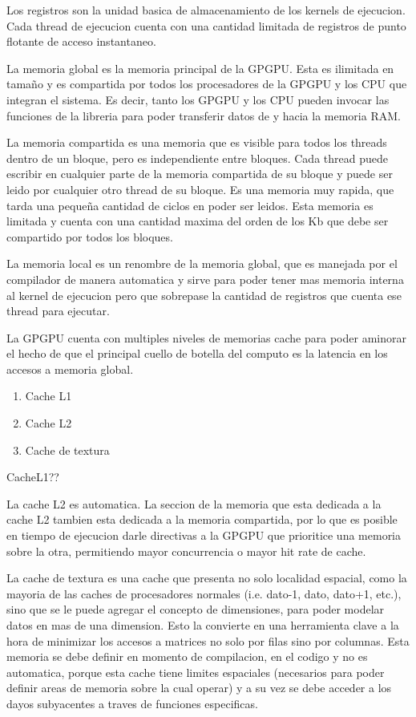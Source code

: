 Los registros son la unidad basica de almacenamiento de los kernels de ejecucion.
Cada thread de ejecucion cuenta con una cantidad limitada de registros de punto flotante de
acceso instantaneo. 

La memoria global es la memoria principal de la GPGPU. Esta es ilimitada en tama\~no 
y es compartida por todos los procesadores de la GPGPU y los CPU que integran el 
sistema. Es decir, tanto los GPGPU y los CPU pueden invocar las funciones de la libreria
para poder transferir datos de y hacia la memoria RAM.

La memoria compartida es una memoria que es visible para todos los threads dentro
de un bloque, pero es independiente entre bloques. Cada thread puede escribir en cualquier
parte de la memoria compartida de su bloque y puede ser leido por cualquier otro thread
de su bloque. Es una memoria muy rapida, que tarda una peque\~na cantidad de ciclos 
en poder ser leidos. Esta memoria es limitada y cuenta con una cantidad maxima del orden de los
Kb que debe ser compartido por todos los bloques.

La memoria local es un renombre de la memoria global, que es manejada por el compilador
de manera automatica y sirve para poder tener mas memoria interna al kernel de ejecucion
pero que sobrepase la cantidad de registros que cuenta ese thread para ejecutar.

La GPGPU cuenta con multiples niveles de memorias cache para poder aminorar el hecho
de que el principal cuello de botella del computo es la latencia en los accesos a memoria 
global.

\begin{enumerate}
  \item Cache L1
  \item Cache L2
  \item Cache de textura
\end{enumerate}

CacheL1??

La cache L2 es automatica. La seccion de la memoria que esta dedicada a la cache L2
tambien esta dedicada a la memoria compartida, por lo que es posible en tiempo de ejecucion
darle directivas a la GPGPU que prioritice una memoria sobre la otra, permitiendo 
mayor concurrencia o mayor hit rate de cache.

La cache de textura es una cache que presenta no solo localidad espacial, como la mayoria
de las caches de procesadores normales (i.e. dato-1, dato, dato+1, etc.), sino que se le
puede agregar el concepto de dimensiones, para poder modelar datos en mas de una dimension.
Esto la convierte en una herramienta clave a la hora de minimizar los accesos a matrices
no solo por filas sino por columnas. Esta memoria se debe definir en momento de compilacion,
en el codigo y no es automatica, porque esta cache tiene limites espaciales (necesarios
para poder definir areas de memoria sobre la cual operar) y a su vez se debe acceder
a los dayos subyacentes a traves de funciones especificas.

